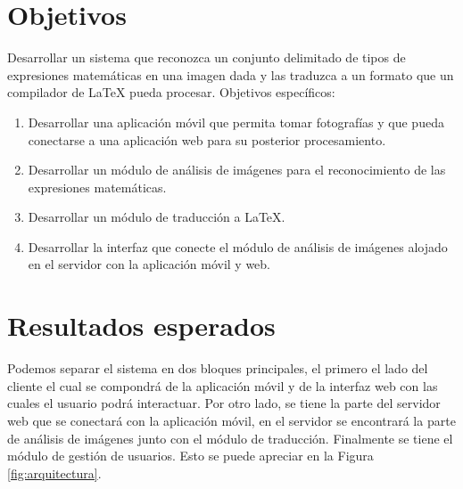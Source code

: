 \section{Objetivos}
Desarrollar un sistema que reconozca un conjunto delimitado de tipos de expresiones matemáticas en una imagen dada y las traduzca a un formato que un compilador de LaTeX pueda procesar.
\bigskip
Objetivos específicos:
\begin{enumerate}
	\item Desarrollar una aplicación móvil que permita tomar fotografías y que pueda conectarse a una aplicación web para su posterior procesamiento.
	\item Desarrollar un módulo de análisis de imágenes para el reconocimiento de las expresiones matemáticas.
	\item Desarrollar un módulo de traducción a LaTeX.
	\item Desarrollar la interfaz que conecte el módulo de análisis de imágenes alojado en el servidor con la aplicación móvil y web.
\end{enumerate}


\section{Resultados esperados}
Podemos separar el sistema en dos bloques principales, el primero el lado del cliente el cual se compondrá de la aplicación móvil y de la interfaz web con las cuales el usuario podrá interactuar. Por otro lado, se tiene la parte del servidor web que se conectará con la aplicación móvil, en el servidor se encontrará la parte de análisis de imágenes junto con el módulo de traducción. Finalmente se tiene el módulo de gestión de usuarios. Esto se puede apreciar en la Figura \ref{fig:arquitectura}.%

